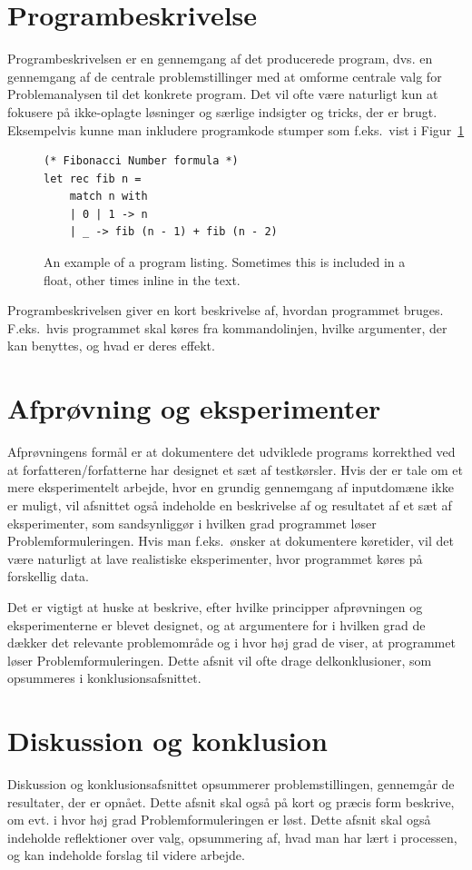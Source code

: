 \documentclass[a4paper]{article}
\begin{document}
\section{Programbeskrivelse}
Programbeskrivelsen er en gennemgang af det producerede program, dvs. en gennemgang af de centrale problemstillinger med at omforme centrale valg for Problemanalysen til det konkrete program. Det vil ofte være naturligt kun at fokusere på ikke-oplagte løsninger og særlige indsigter og tricks, der er brugt. Eksempelvis kunne man inkludere programkode stumper som f.eks.\ vist i Figur~\ref{fig:fsharpCodeExample}
\begin{figure}
  \lstset{language=FSharp}
\begin{lstlisting}
(* Fibonacci Number formula *)
let rec fib n =
    match n with
    | 0 | 1 -> n
    | _ -> fib (n - 1) + fib (n - 2)
\end{lstlisting}
  \caption{An example of a program listing. Sometimes this is included in a float, other times inline in the text.}
  \label{fig:fsharpCodeExample}
\end{figure}


Programbeskrivelsen giver en kort beskrivelse af, hvordan programmet bruges. F.eks.\ hvis programmet skal køres fra kommandolinjen, hvilke argumenter, der kan benyttes, og hvad er deres effekt. 


\section{Afprøvning og eksperimenter}
Afprøvningens formål er at dokumentere det udviklede programs korrekthed ved at forfatteren/forfatterne har designet et sæt af testkørsler. Hvis der er tale om et mere eksperimentelt arbejde, hvor en grundig gennemgang af inputdomæne ikke er muligt, vil afsnittet også indeholde en beskrivelse af og resultatet af et sæt af eksperimenter, som sandsynliggør i hvilken grad programmet løser Problemformuleringen. Hvis man f.eks.\ ønsker at dokumentere køretider, vil det være naturligt at lave realistiske eksperimenter, hvor programmet køres på forskellig data.

Det er vigtigt at huske at beskrive, efter hvilke principper afprøvningen og eksperimenterne er blevet designet, og at argumentere for i hvilken grad de dækker det relevante problemområde og i hvor høj grad de viser, at programmet løser Problemformuleringen. Dette afsnit vil ofte drage delkonklusioner, som opsummeres i konklusionsafsnittet.

\section{Diskussion og konklusion}
Diskussion og konklusionsafsnittet opsummerer problemstillingen, gennemgår de resultater, der er opnået. Dette afsnit skal også på kort og præcis form beskrive, om evt. i hvor høj grad Problemformuleringen er løst. Dette afsnit skal også indeholde reflektioner over valg, opsummering af, hvad man har lært i processen, og kan indeholde forslag til videre arbejde.
\end{document}
